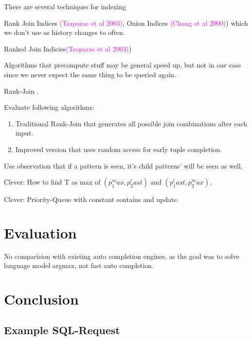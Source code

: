 \documentclass[11pt,a4paper]{report}
\newcommand{\mbref}[1]{\textcolor{magenta}{(#1)}}
\begin{document}
There are several techniques for indexing {Rank Join Indices \mbref{Tsaparas et
al 2003}, Onion Indices \mbref{Chang et al 2000}) which we don't use as history
changes to often.

Ranked Join Indicies\mbref{Tsaparas et al 2003})

Algorithms that precompute stuff may be general speed up, but not in our case
since we never expect the same thing to be queried again.

Rank-Join \parencite{Ilyas2004}.

Evaluate following algorithms:

\begin{enumerate}
  \item Traditional Rank-Join that generates all possible join combinations
    after each input.
  \item Improved version that uses random access for early tuple completion.
\end{enumerate}

Use observation that if a pattern is seen, it's child patterns' will be seen as
well.

Clever: How to find T as max of $(p_1^max, p_2^last)$ and $(p_1^last, p_2^max)$.

Clever: Priority-Queue with constant contains and update.

\chapter{Evaluation}

No comparision with existing auto completion engines, as the goal was to solve
language model argmax, not fast auto completion.

\chapter{Conclusion}

\printbibliography

\begin{appendices}

\chapter{Example SQL-Request}
\label{app-sql-example}


\end{appendices}}
\end{document}
